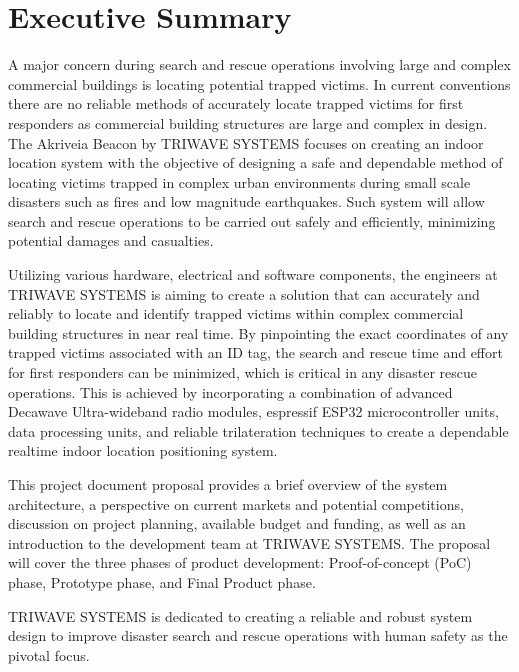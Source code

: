 

\section*{Executive Summary}	%
\bigskip
A major concern during search and rescue operations involving large and complex commercial buildings is locating potential trapped victims. In current conventions there are no reliable methods of accurately locate trapped victims for first responders as commercial building structures are large and complex in design. The Akriveia Beacon by TRIWAVE SYSTEMS focuses on creating an indoor location system with the objective of designing a safe and dependable method of locating victims trapped in complex urban environments during small scale disasters such as fires and low magnitude earthquakes. Such system will allow search and rescue operations to be carried out safely and efficiently, minimizing potential damages and casualties.

\bigskip
Utilizing various hardware, electrical and software components, the engineers at TRIWAVE SYSTEMS is aiming to create a solution that can accurately and reliably to locate and identify trapped victims within complex commercial building structures in near real time. By pinpointing the exact coordinates of any trapped victims associated with an ID tag, the search and rescue time and effort for first responders can be minimized, which is critical in any disaster rescue operations. This is achieved by incorporating a combination of advanced Decawave Ultra-wideband radio modules, espressif ESP32 microcontroller units, data processing units, and reliable trilateration techniques to create a dependable realtime indoor location positioning system.

\bigskip
This project document proposal provides a brief overview of the system architecture, a perspective on current markets and potential competitions, discussion on project planning, available budget and funding, as well as an introduction to the development team at TRIWAVE SYSTEMS. The proposal will cover the three phases of product development: Proof-of-concept (PoC) phase, Prototype phase, and Final Product phase.

\bigskip
TRIWAVE SYSTEMS is dedicated to creating a reliable and robust system design to improve disaster search and rescue operations with human safety as the pivotal focus.

